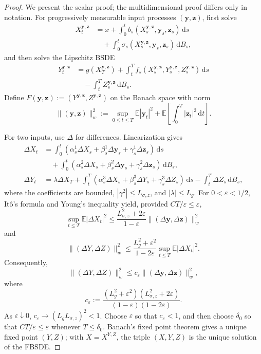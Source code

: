 \begin{proof}
We present the scalar proof; the multidimensional proof differs only in
notation.  For progressively measurable input processes $(\mathbf y,
\mathbf z)$, first solve
\[
\begin{aligned}
  X_t^{\mathbf y,\mathbf z}
  &=x+\int_0^t b_s(X_s^{\mathbf y,\mathbf z},\mathbf y_s,\mathbf z_s)
      \,\mathrm ds\\
  &\quad+\int_0^t
    \sigma_s(X_s^{\mathbf y,\mathbf z},\mathbf y_s,\mathbf z_s)
    \,\mathrm dB_s,
\end{aligned}
\]
and then solve the Lipschitz BSDE
\[
\begin{aligned}
  Y_t^{\mathbf y,\mathbf z}
  &=g(X_T^{\mathbf y,\mathbf z})
    +\int_t^T f_s(
      X_s^{\mathbf y,\mathbf z},
      Y_s^{\mathbf y,\mathbf z},
      Z_s^{\mathbf y,\mathbf z}
    )\,\mathrm ds\\
  &\quad-\int_t^T Z_s^{\mathbf y,\mathbf z}\,\mathrm dB_s.
\end{aligned}
\]
Define
$F(\mathbf y,\mathbf z):=(Y^{\mathbf y,\mathbf z},
Z^{\mathbf y,\mathbf z})$ on the Banach space with norm
\[
  \|(\mathbf y,\mathbf z)\|_w^2
  :=\sup_{0\le t\le T}\mathbb E|\mathbf y_t|^2
    +\mathbb E\!\left[\int_0^T|\mathbf z_t|^2\,\mathrm dt\right].
\]

For two inputs, use $\Delta$ for differences.  Linearization gives
\[
\begin{aligned}
  \Delta X_t
  &=\int_0^t(\alpha_s^1\Delta X_s
    +\beta_s^1\Delta\mathbf y_s
    +\gamma_s^1\Delta\mathbf z_s)\,\mathrm ds\\
  &\quad+\int_0^t(\alpha_s^2\Delta X_s
    +\beta_s^2\Delta\mathbf y_s
    +\gamma_s^2\Delta\mathbf z_s)\,\mathrm dB_s,\\
  \Delta Y_t
  &=\lambda\Delta X_T
    +\int_t^T(\alpha_s^3\Delta X_s
      +\beta_s^3\Delta Y_s
      +\gamma_s^3\Delta Z_s)\,\mathrm ds
    -\int_t^T\Delta Z_s\,\mathrm dB_s,
\end{aligned}
\]
where the coefficients are bounded,
$|\gamma^2|\le L_{\sigma,z}$, and $|\lambda|\le L_g$.
For $0<\varepsilon<1/2$, It\^o's formula and Young's inequality yield,
provided $CT/\varepsilon\le\varepsilon$,
\[
  \sup_{t\le T}\mathbb E|\Delta X_t|^2
  \le\frac{L_{\sigma,z}^2+2\varepsilon}{1-\varepsilon}
      \|(\Delta\mathbf y,\Delta\mathbf z)\|_w^2
\]
and
\[
  \|(\Delta Y,\Delta Z)\|_w^2
  \le\frac{L_g^2+\varepsilon^2}{1-2\varepsilon}
      \sup_{t\le T}\mathbb E|\Delta X_t|^2.
\]
Consequently,
\[
  \|(\Delta Y,\Delta Z)\|_w^2
  \le c_\varepsilon
    \|(\Delta\mathbf y,\Delta\mathbf z)\|_w^2,
\]
where
\[
  c_\varepsilon
  :=\frac{(L_g^2+\varepsilon^2)(L_{\sigma,z}^2+2\varepsilon)}
          {(1-\varepsilon)(1-2\varepsilon)}.
\]
As $\varepsilon\downarrow0$,
$c_\varepsilon\to(L_gL_{\sigma,z})^2<1$.  Choose $\varepsilon$ so that
$c_\varepsilon<1$, and then choose $\delta_0$ so that
$CT/\varepsilon\le\varepsilon$ whenever $T\le\delta_0$.  Banach's fixed
point theorem gives a unique fixed point $(Y,Z)$; with
$X=X^{Y,Z}$, the triple $(X,Y,Z)$ is the unique solution of the FBSDE\@.


\end{proof}
